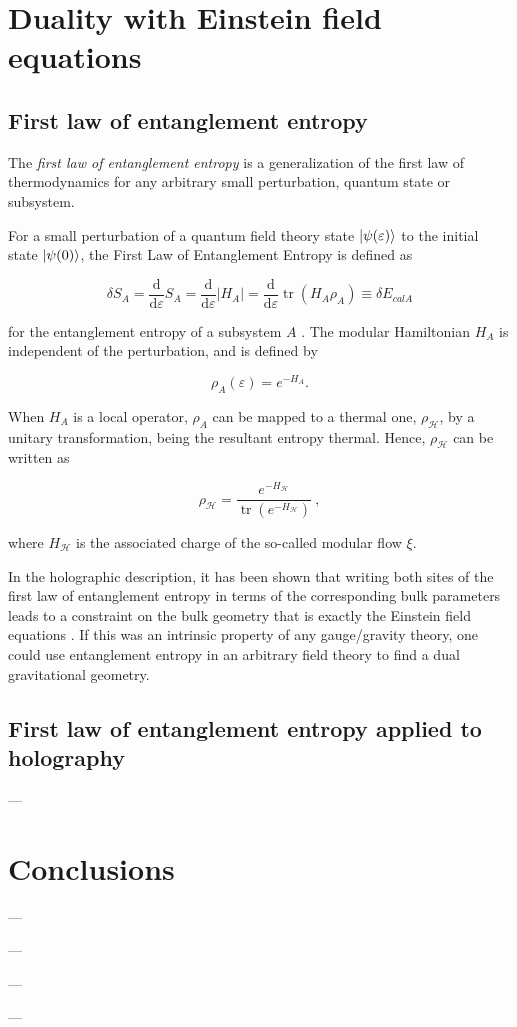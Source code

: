 \documentclass[twocolumn]{revtex4}
\providecommand{\abs}[1]{\lvert#1\rvert}
\providecommand{\eq}[2]{
    \begin{equation}
        #2
    \label{eq:#1}
    \end{equation}
}
\DeclareMathOperator{\calH}{\mathcal{H}}
\DeclareMathOperator{\tr}{tr}
\begin{document}
\section{Duality with Einstein field equations} \label{s:EQ}


\subsection{First law of entanglement entropy} \label{ss:FLEE}

The \textit{first law of entanglement entropy} is a generalization of the first law of thermodynamics for any arbitrary small perturbation, quantum state or subsystem.

For a small perturbation of a quantum field theory state $\ket{\psi(\varepsilon)}$ to the initial state $\ket{\psi(0)}$, the First Law of Entanglement Entropy is defined as
\eq{FLEE}{
    \delta S_A = \frac{\mathrm{d}}{\mathrm{d} \varepsilon} S_A = \frac{\mathrm{d}}{\mathrm{d} \varepsilon} \abs{H_A} = \frac{\mathrm{d}}{\mathrm{d} \varepsilon} \tr (H_A \rho_A) \equiv \delta E_{calA}
}
for the entanglement entropy of a subsystem $A$ \cite{fareghbal_first_2019}. The modular Hamiltonian $H_A$ is independent of the perturbation, and is defined by
\eq{modularH}{
    \rho_A (\varepsilon) = e^{-H_A}.
}

When $H_A$ is a local operator, $\rho_A$ can be mapped to a thermal one, $\rho_{\calH}$, by a unitary transformation, being the resultant entropy thermal. Hence, $\rho_{\calH}$ can be written as
\eq{modularH2}{
    \rho_{\calH} = \frac{e^{-H_{\calH}}}{\tr (e^{-H_{\calH}})} \ ,
}
where $H_{\calH}$ is the associated charge of the so-called modular flow $\xi$.

In the holographic description, it has been shown that writing both sites of the first law of entanglement entropy in terms of the corresponding bulk parameters leads to a constraint on the bulk geometry that is exactly the Einstein field equations \cite{fareghbal_first_2019}. If this was an intrinsic property of any gauge/gravity theory, one could use entanglement entropy in an arbitrary field theory to find a dual gravitational geometry.


\subsection{First law of entanglement entropy applied to holography} \label{ss:FLEE_H}

---


\section{Conclusions} \label{s:Conclusions}

---


\begin{acknowledgments}

---

---

---
    
\end{acknowledgments}




\end{document}
